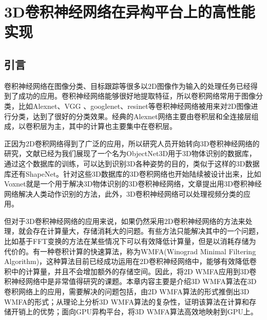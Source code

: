 \chapter{3D卷积神经网络在异构平台上的高性能实现}
\label{3DWinograd}
\section{引言}
卷积神经网络在图像分类、目标跟踪等很多以2D图像作为输入的处理任务已经得到了成功的应用。卷积神经网络能够很好地提取特征，所以卷积网络常用于图像分类，比如Alexnet、VGG 、googlenet、resinet等卷积神经网络被用来对2D图像进行分类，达到了很好的分类效果。经典的Alexnet网络主要由卷积层和全连接层组成，以卷积层为主，其中的计算也主要集中在卷积层。

正因为2D卷积网络得到了广泛的应用，所以研究人员开始转向3D卷积神经网络的研究，文献已经为我们展现了一个名为ObjectNet3D用于3D物体识别的数据库，通过这个数据库的训练，可以达到识别3D各种姿势的目的，类似于这样的3D数据库还有ShapeNet。针对这些3D数据库的3D卷积网络也开始陆续被设计出来，比如Voxnet就是一个用于解决3D物体识别的3D卷积神经网络，文章提出用3D卷积神经网络解决人类动作识别的方法，此外，3D卷积神经网络可以处理视频分类的应用。

但对于3D卷积神经网络的应用来说，如果仍然采用2D卷积神经网络的方法来处理，就会存在计算量大，存储消耗大的问题。有些方法只能解决其中的一个问题，比如基于FFT变换的方法在某些情况下可以有效降低计算量，但是以消耗存储为代价的。有一种卷积计算的快速算法，称为WMFA(Winograd Minimal Filtering Algorithm)，这种算法目前已经成功运用在2D卷积神经网络中，能够有效降低卷积中的计算量，并且不会增加额外的存储空间。因此，将2D WMFA应用到3D卷积神经网络中是非常值得研究的课题。本章内容主要是介绍3D WMFA算法在3D卷积网络上的应用，需要解决的问题包括，由2D WMFA算法的形式推倒出3D WMFA的形式；从理论上分析3D WMFA算法的复杂性，证明该算法在计算和存储开销上的优势；面向GPU异构平台，将3D WMFA算法高效地映射到GPU上。

